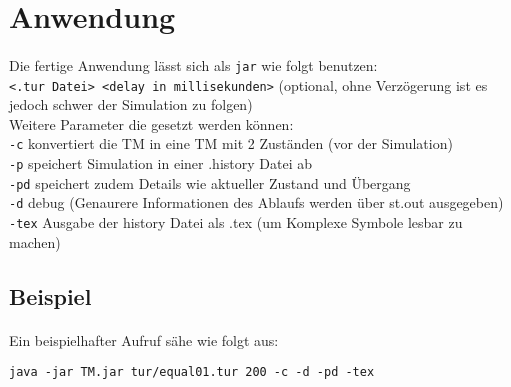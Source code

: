 \documentclass[10pt, a4paper]{article}
\newcommand{\ilc}{\texttt}
\begin{document}
\section*{Anwendung}
\paragraph*{}
Die fertige Anwendung lässt sich als \ilc{jar} wie folgt benutzen:\\
\ilc{<.tur Datei> <delay in millisekunden>} (optional, ohne Verzögerung ist es jedoch schwer der Simulation zu folgen)\\
Weitere Parameter die gesetzt werden können:\\
\ilc{-c} konvertiert die TM in eine TM mit 2 Zuständen (vor der Simulation)\\
\ilc{-p} speichert Simulation in einer .history Datei ab\\
\ilc{-pd} speichert zudem Details wie aktueller Zustand und Übergang\\
\ilc{-d} debug (Genaurere Informationen des Ablaufs werden über st.out ausgegeben)\\
\ilc{-tex} Ausgabe der history Datei als .tex (um Komplexe Symbole lesbar zu machen)

\subsection*{Beispiel}
\paragraph*{}
Ein beispielhafter Aufruf sähe wie folgt aus:\par

\begin{tcolorbox}
\begin{verbatim}
java -jar TM.jar tur/equal01.tur 200 -c -d -pd -tex
\end{verbatim}
\end{tcolorbox}
\end{document}
